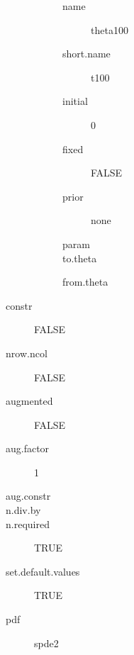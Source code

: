 \begin{description}
\begin{description}
	 	 \begin{description}
	 	 	 \item[ name ] theta100 
	 	 	 \item[ short.name ] t100 
	 	 	 \item[ initial ] 0 
	 	 	 \item[ fixed ] FALSE 
	 	 	 \item[ prior ] none 
	 	 	 \item[ param ]  
	 	 	 \item[ to.theta ] \verb|| 
	 	 	 \item[ from.theta ] \verb|| 
	 	 \end{description}
	 \end{description}
	 \item[ constr ] FALSE 
	 \item[ nrow.ncol ] FALSE 
	 \item[ augmented ] FALSE 
	 \item[ aug.factor ] 1 
	 \item[ aug.constr ]  
	 \item[ n.div.by ]  
	 \item[ n.required ] TRUE 
	 \item[ set.default.values ] TRUE 
	 \item[ pdf ] spde2 
\end{description}
